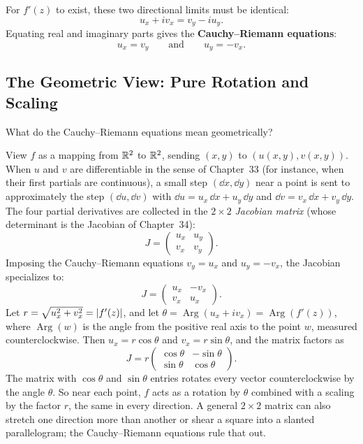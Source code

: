 For $f'(z)$ to exist, these two directional limits must be identical:
\[
u_x + i v_x = v_y - i u_y.
\]
Equating real and imaginary parts gives the \textbf{Cauchy--Riemann equations}:
\begin{equation}
u_x = v_y \qquad \text{and} \qquad u_y = -v_x.
\label{ch35:eq-cauchy-riemann}
\end{equation}

\subsection{The Geometric View: Pure Rotation and Scaling}

What do the Cauchy--Riemann equations mean geometrically?

View $f$ as a mapping from $\mathbb{R}^2$ to $\mathbb{R}^2$, sending $(x,y)$ to $(u(x,y), v(x,y))$. When $u$ and $v$ are differentiable in the sense of Chapter~33 (for instance, when their first partials are continuous), a small step $(\dd x,\dd y)$ near a point is sent to approximately the step $(\dd u,\dd v)$ with $\dd u = u_x\,\dd x + u_y\,\dd y$ and $\dd v = v_x\,\dd x + v_y\,\dd y$. The four partial derivatives are collected in the $2 \times 2$ \emph{Jacobian matrix} (whose determinant is the Jacobian of Chapter~34):
\[
J = \begin{pmatrix} u_x & u_y \\ v_x & v_y \end{pmatrix}.
\]
Imposing the Cauchy--Riemann equations $v_y = u_x$ and $u_y = -v_x$, the Jacobian specializes to:
\[
J = \begin{pmatrix} u_x & -v_x \\ v_x & u_x \end{pmatrix}.
\]
Let $r = \sqrt{u_x^2 + v_x^2} = \lvert f'(z)\rvert$, and let $\theta = \operatorname{Arg}(u_x + i v_x) = \operatorname{Arg}(f'(z))$, where $\operatorname{Arg}(w)$ is the angle from the positive real axis to the point $w$, measured counterclockwise. Then $u_x = r\cos\theta$ and $v_x = r\sin\theta$, and the matrix factors as
\[
J = r \begin{pmatrix} \cos\theta & -\sin\theta \\ \sin\theta & \cos\theta \end{pmatrix}.
\]
The matrix with $\cos\theta$ and $\sin\theta$ entries rotates every vector counterclockwise by the angle $\theta$. So near each point, $f$ acts as a rotation by $\theta$ combined with a scaling by the factor $r$, the same in every direction. A general $2\times 2$ matrix can also stretch one direction more than another or shear a square into a slanted parallelogram; the Cauchy--Riemann equations rule that out.

